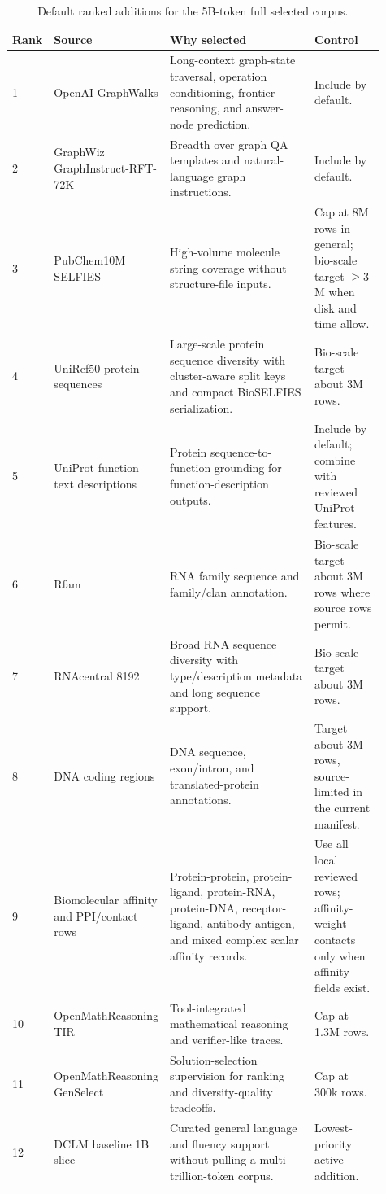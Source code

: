 \documentclass[11pt]{article}
\newcommand{\1}{\mathbf{1}}
\begin{document}
{\scriptsize
\setlength{\tabcolsep}{2pt}
\begin{longtable}{p{0.05\linewidth}p{0.23\linewidth}p{0.43\linewidth}p{0.20\linewidth}}
\caption{Default ranked additions for the 5B-token full selected corpus.}\\
\toprule
Rank & Source & Why selected & Control \\
\midrule
\endhead
1 & OpenAI GraphWalks & Long-context graph-state traversal, operation conditioning, frontier reasoning, and answer-node prediction. & Include by default. \\
2 & GraphWiz GraphInstruct-RFT-72K & Breadth over graph QA templates and natural-language graph instructions. & Include by default. \\
3 & PubChem10M SELFIES & High-volume molecule string coverage without structure-file inputs. & Cap at 8M rows in general; bio-scale target $\geq 3$M when disk and time allow. \\
4 & UniRef50 protein sequences & Large-scale protein sequence diversity with cluster-aware split keys and compact BioSELFIES serialization. & Bio-scale target about 3M rows. \\
5 & UniProt function text descriptions & Protein sequence-to-function grounding for function-description outputs. & Include by default; combine with reviewed UniProt features. \\
6 & Rfam & RNA family sequence and family/clan annotation. & Bio-scale target about 3M rows where source rows permit. \\
7 & RNAcentral 8192 & Broad RNA sequence diversity with type/description metadata and long sequence support. & Bio-scale target about 3M rows. \\
8 & DNA coding regions & DNA sequence, exon/intron, and translated-protein annotations. & Target about 3M rows, source-limited in the current manifest. \\
9 & Biomolecular affinity and PPI/contact rows & Protein-protein, protein-ligand, protein-RNA, protein-DNA, receptor-ligand, antibody-antigen, and mixed complex scalar affinity records. & Use all local reviewed rows; affinity-weight contacts only when affinity fields exist. \\
10 & OpenMathReasoning TIR & Tool-integrated mathematical reasoning and verifier-like traces. & Cap at 1.3M rows. \\
11 & OpenMathReasoning GenSelect & Solution-selection supervision for ranking and diversity-quality tradeoffs. & Cap at 300k rows. \\
12 & DCLM baseline 1B slice & Curated general language and fluency support without pulling a multi-trillion-token corpus. & Lowest-priority active addition. \\
\bottomrule
\end{longtable}}
\end{document}
